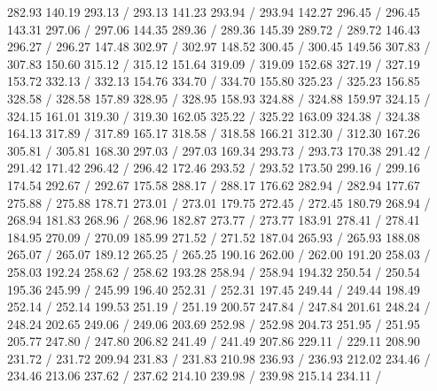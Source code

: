 { 282.93 140.19 293.13 /
 293.13 141.23 293.94 /
 293.94 142.27 296.45 /
 296.45 143.31 297.06 /
 297.06 144.35 289.36 /
 289.36 145.39 289.72 /
 289.72 146.43 296.27 /
 296.27 147.48 302.97 /
 302.97 148.52 300.45 /
 300.45 149.56 307.83 /
 307.83 150.60 315.12 /
 315.12 151.64 319.09 /
 319.09 152.68 327.19 /
 327.19 153.72 332.13 /
 332.13 154.76 334.70 /
 334.70 155.80 325.23 /
 325.23 156.85 328.58 /
 328.58 157.89 328.95 /
 328.95 158.93 324.88 /
 324.88 159.97 324.15 /
 324.15 161.01 319.30 /
 319.30 162.05 325.22 /
 325.22 163.09 324.38 /
 324.38 164.13 317.89 /
 317.89 165.17 318.58 /
 318.58 166.21 312.30 /
 312.30 167.26 305.81 /
 305.81 168.30 297.03 /
 297.03 169.34 293.73 /
 293.73 170.38 291.42 /
 291.42 171.42 296.42 /
 296.42 172.46 293.52 /
 293.52 173.50 299.16 /
 299.16 174.54 292.67 /
 292.67 175.58 288.17 /
 288.17 176.62 282.94 /
 282.94 177.67 275.88 /
 275.88 178.71 273.01 /
 273.01 179.75 272.45 /
 272.45 180.79 268.94 /
 268.94 181.83 268.96 /
 268.96 182.87 273.77 /
 273.77 183.91 278.41 /
 278.41 184.95 270.09 /
 270.09 185.99 271.52 /
 271.52 187.04 265.93 /
 265.93 188.08 265.07 /
 265.07 189.12 265.25 /
 265.25 190.16 262.00 /
 262.00 191.20 258.03 /
 258.03 192.24 258.62 /
 258.62 193.28 258.94 /
 258.94 194.32 250.54 /
 250.54 195.36 245.99 /
 245.99 196.40 252.31 /
 252.31 197.45 249.44 /
 249.44 198.49 252.14 /
 252.14 199.53 251.19 /
 251.19 200.57 247.84 /
 247.84 201.61 248.24 /
 248.24 202.65 249.06 /
 249.06 203.69 252.98 /
 252.98 204.73 251.95 /
 251.95 205.77 247.80 /
 247.80 206.82 241.49 /
 241.49 207.86 229.11 /
 229.11 208.90 231.72 /
 231.72 209.94 231.83 /
 231.83 210.98 236.93 /
 236.93 212.02 234.46 /
 234.46 213.06 237.62 /
 237.62 214.10 239.98 /
 239.98 215.14 234.11 /
}
